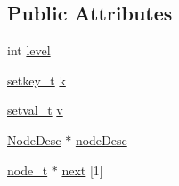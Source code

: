 \subsection*{Public Attributes}
\begin{DoxyCompactItemize}
\item 
int \hyperlink{structnode__t_aea0bf952e2a3c84777c04ff7a76321f8}{level}
\item 
\hyperlink{lockfreeskip_8h_a3945a06384f87c28e0642d51b0524e92}{setkey\-\_\-t} \hyperlink{structnode__t_ab851bf8495cbb6ec9249dd9c1444ee34}{k}
\item 
\hyperlink{lockfreeskip_8h_a07e25227a67b4e708996b09fd575408b}{setval\-\_\-t} \hyperlink{structnode__t_a5916706b9b39ffacdcaeee08f063d00d}{v}
\item 
\hyperlink{structNodeDesc}{Node\-Desc} $\ast$ \hyperlink{structnode__t_a02362ef9d6faa3af1fbe7bbf53ef4111}{node\-Desc}
\item 
\hyperlink{structnode__t}{node\-\_\-t} $\ast$ \hyperlink{structnode__t_a294f71ce3f5b22412a1291a353f0acf1}{next} \mbox{[}1\mbox{]}
\end{DoxyCompactItemize}


